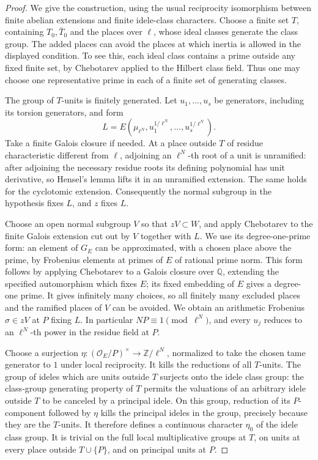 \documentclass[11pt,a4paper]{article}
\theoremstyle{definition}
\newcommand{\Q}{\mathbb Q}
\newcommand{\Z}{\mathbb Z}
\begin{document}
\begin{proof}
We give the construction, using the usual reciprocity
isomorphism between finite abelian extensions and finite
idele-class characters. Choose a finite set \(T\), containing
\(T_0,\bar T_0\) and the places over \(\ell\), whose ideal classes
generate the class group. The added places can avoid the
places at which inertia is allowed in the displayed condition.
To see this, each ideal class contains a prime outside any
fixed finite set, by Chebotarev applied to the Hilbert class
field. Thus one may choose one representative prime in each
of a finite set of generating classes.

The group of \(T\)-units is finitely generated. Let \(u_1,\ldots,u_s\)
be generators, including its torsion generators, and form
\[
 L=E(\mu_{\ell^N},u_1^{1/\ell^N},\ldots,u_s^{1/\ell^N}).
\]
Take a finite Galois closure if needed.
At a place outside \(T\) of residue characteristic different
from \(\ell\), adjoining an \(\ell^N\)-th root of a unit is
unramified: after adjoining the necessary residue roots its
defining polynomial has unit derivative, so Hensel's lemma
lifts it in an unramified extension.
The same holds for the cyclotomic extension.
Consequently the normal subgroup in the hypothesis fixes
\(L\), and \(z\) fixes \(L\).

Choose an open normal subgroup \(V\) so that \(zV\subset W\),
and apply Chebotarev to the finite Galois extension cut out by
\(V\) together with \(L\). We use its degree-one-prime form:
an element of \(G_E\) can be approximated, with a chosen
place above the prime, by Frobenius elements at primes of
\(E\) of rational prime norm. This form follows by applying
Chebotarev to a Galois closure over \(\Q\), extending the
specified automorphism which fixes \(E\); its fixed embedding
of \(E\) gives a degree-one prime. It gives infinitely many
choices, so all finitely many excluded places and the
ramified places of \(V\) can be avoided.
We obtain an arithmetic Frobenius \(\sigma\in zV\) at \(P\)
fixing \(L\). In particular \(NP\equiv1\pmod{\ell^N}\), and
every \(u_j\) reduces to an \(\ell^N\)-th power in the residue
field at \(P\).

Choose a surjection
\(\eta:(\mathcal O_E/P)^\times\to\Z/\ell^N\), normalized to
take the chosen tame generator to \(1\) under local
reciprocity. It kills the reductions of all \(T\)-units.
The group of ideles which are units outside \(T\) surjects
onto the idele class group: the class-group generating
property of \(T\) permits the valuations of an arbitrary
idele outside \(T\) to be canceled by a principal idele.
On this group, reduction of its \(P\)-component followed by
\(\eta\) kills the principal ideles in the group, precisely
because they are the \(T\)-units. It therefore defines a
continuous character \(\eta_0\) of the idele class group.
It is trivial on the full local multiplicative groups at
\(T\), on units at every place outside \(T\cup\{P\}\), and
on principal units at \(P\).


\end{proof}
\end{document}
